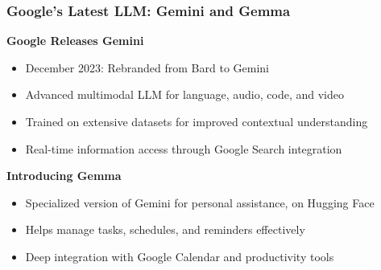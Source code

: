 \begin{frame}[fragile]\frametitle{Google's Latest LLM: Gemini and Gemma}

\textbf{Google Releases Gemini}

    \begin{itemize}
        \item December 2023: Rebranded from Bard to Gemini
        \item Advanced multimodal LLM for language, audio, code, and video
        \item Trained on extensive datasets for improved contextual understanding
        \item Real-time information access through Google Search integration
    \end{itemize}

\textbf{Introducing Gemma}

    \begin{itemize}
        \item Specialized version of Gemini for personal assistance, on Hugging Face
        \item Helps manage tasks, schedules, and reminders effectively
        \item Deep integration with Google Calendar and productivity tools
    \end{itemize}

\end{frame}







